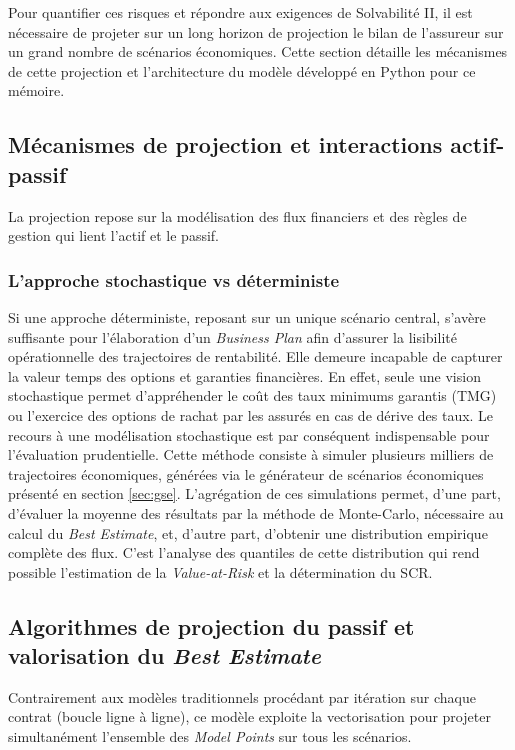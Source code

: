 Pour quantifier ces risques et répondre aux exigences de Solvabilité II, il est nécessaire de projeter sur un long horizon de projection le bilan de l'assureur sur un grand nombre de scénarios économiques. Cette section détaille les mécanismes de cette projection et l'architecture du modèle développé en Python pour ce mémoire.

\subsection{Mécanismes de projection et interactions actif-passif}

La projection repose sur la modélisation des flux financiers et des règles de gestion qui lient l'actif et le passif.

\subsubsection*{L'approche stochastique vs déterministe}
Si une approche déterministe, reposant sur un unique scénario central, s'avère suffisante pour l'élaboration d'un \textit{Business Plan} afin d'assurer la lisibilité opérationnelle des trajectoires de rentabilité. Elle demeure incapable de capturer la valeur temps des options et garanties financières. En effet, seule une vision stochastique permet d'appréhender le coût des taux minimums garantis (TMG) ou l'exercice des options de rachat par les assurés en cas de dérive des taux. Le recours à une modélisation stochastique est par conséquent indispensable pour l'évaluation prudentielle. Cette méthode consiste à simuler plusieurs milliers de trajectoires économiques, générées via le générateur de scénarios économiques présenté en section \ref{sec:gse}. L'agrégation de ces simulations permet, d'une part, d'évaluer la moyenne des résultats par la méthode de Monte-Carlo, nécessaire au calcul du \textit{Best Estimate}, et, d'autre part, d'obtenir une distribution empirique complète des flux. C'est l'analyse des quantiles de cette distribution qui rend possible l'estimation de la \textit{Value-at-Risk} et la détermination du SCR.

\subsection{Algorithmes de projection du passif et valorisation du \textit{Best Estimate}}
\label{subsec:algo_passif_be}

Contrairement aux modèles traditionnels procédant par itération sur chaque contrat (boucle ligne à ligne), ce modèle exploite la vectorisation pour projeter simultanément l'ensemble des \textit{Model Points} sur tous les scénarios.

